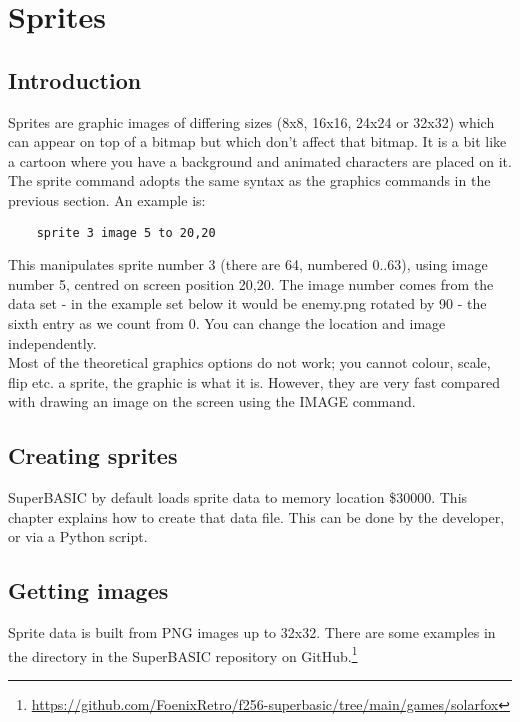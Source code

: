 \chapter{Sprites}

\section{Introduction}

Sprites are graphic images of differing sizes (8x8, 16x16, 24x24 or 32x32) which can appear on top of a bitmap but which don't affect that bitmap. It is a bit like a cartoon where you have a background and animated characters are placed on it.\\

The sprite command adopts the same syntax as the graphics commands in the previous section. An example is:

\begin{verbatim}
	sprite 3 image 5 to 20,20
\end{verbatim}

This manipulates sprite number 3 (there are 64, numbered 0..63), using image number 5, centred on screen position 20,20. The image number comes from the data set - in the example set below it would be enemy.png rotated by 90 - the sixth entry as we count from 0. You can change the location and image independently.\\

Most of the theoretical graphics options do not work; you cannot colour, scale, flip etc. a sprite, the graphic is what it is. However, they are very fast compared with drawing an image on the screen using the IMAGE command.

\section {Creating sprites}

SuperBASIC by default loads sprite data to memory location \$30000. This chapter explains how to create that data file.  This can be done by the developer, or via a Python script.

\section{Getting images}

Sprite data is built from PNG images up to 32x32. There are some examples in the  directory in the SuperBASIC repository on GitHub.\footnote{\url{https://github.com/FoenixRetro/f256-superbasic/tree/main/games/solarfox}}\\

